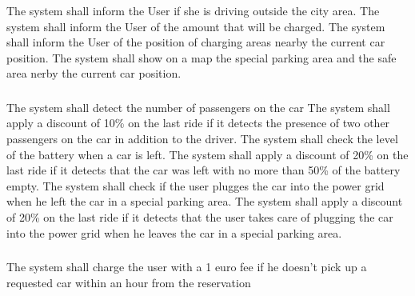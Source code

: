 \begin{itemize}
	\reqcounter The system shall inform the User if she is driving outside the city area.
	\reqcounter The system shall inform the User of the amount that will be charged.
	\reqcounter The system shall inform the User of the position of charging areas nearby the current car position.
	\reqcounter The system shall show on a map the special parking area and the safe area nerby the current car position.
\end{itemize}

\subsubsection{}

\subsubsection{}


\subsubsection{}
\begin{itemize}
	\reqcounter The system shall detect the number of passengers on the car
	\reqcounter The system shall apply a discount of 10\% on the last ride if it detects the presence of two other passengers on the car in addition to the driver.
	\reqcounter The system shall check the level of the battery when a car is left.
	\reqcounter The system shall apply a discount 	of 20\% on the last ride if it detects that the car was left with no more than 50\% of the battery empty.
	\reqcounter The system shall check if the user plugges the car into the power grid when he left the car in a special parking area.
	\reqcounter The system shall apply a discount 	of 20\% on the last ride if it detects that the user takes care of plugging the car into the power grid when he leaves the car in a special parking area. 
\end{itemize}

\subsubsection{}

\begin{itemize}
	\reqcounter The system shall charge the user with a 1 euro fee if he doesn't pick up a requested car within an hour from the reservation
	
\end{itemize}

